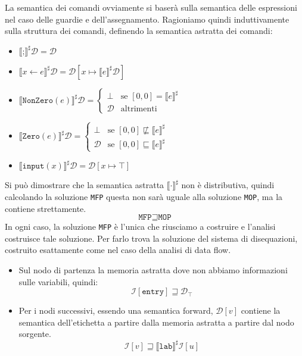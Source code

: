 La semantica dei comandi ovviamente si baserà sulla semantica delle espressioni 
nel caso delle guardie e dell'assegnamento. Ragioniamo quindi induttivamente sulla
struttura dei comandi, definendo la semantica astratta dei comandi:
\begin{itemize}
    \item $\llbracket \texttt{;} \rrbracket^\sharp \mathcal{D} = \mathcal{D}$
    \item $\llbracket x \gets e \rrbracket^\sharp \mathcal{D} =
    \mathcal{D}[x \mapsto \llbracket e \rrbracket^\sharp \mathcal{D}]$
    \item $\llbracket \texttt{NonZero}(e) \rrbracket^\sharp \mathcal{D} =
    \begin{cases}
        \bot & \text{se } [0, 0] = \llbracket e \rrbracket^\sharp \\
        \mathcal{D} & \text{altrimenti}
    \end{cases}
    $
    \item $\llbracket \texttt{Zero}(e) \rrbracket^\sharp \mathcal{D} =
    \begin{cases}
        \bot & \text{se } [0, 0] \not \sqsubseteq \llbracket e \rrbracket^\sharp \\
        \mathcal{D} & \text{se } [0, 0] \sqsubseteq \llbracket e \rrbracket^\sharp
    \end{cases}
    $
    \item $\llbracket \texttt{input}(x) \rrbracket^\sharp \mathcal{D} =
    \mathcal{D}[x \mapsto \top ]$
\end{itemize}
Si può dimostrare che la semantica astratta $\llbracket \cdot \rrbracket^\sharp$ non 
è distributiva, quindi calcolando la soluzione \texttt{MFP} questa non sarà uguale 
alla soluzione \texttt{MOP}, ma la contiene strettamente.
\[
  \texttt{MFP} \sqsupseteq \texttt{MOP}  
\]
In ogni caso, la soluzione \texttt{MFP} è l'unica che riusciamo a costruire e l'analisi 
costruisce tale soluzione. 
Per farlo trova la soluzione del sistema di disequazioni, costruito esattamente come nel 
caso della analisi di data flow.
\begin{itemize}
    \item Sul nodo di partenza la memoria astratta dove 
    non abbiamo informazioni sulle variabili, quindi:
    \[
        \mathcal{I}[\texttt{entry}] \sqsupseteq \mathcal{D}_\top 
    \]
    \item Per i nodi successivi, essendo una semantica forward, $\mathcal{D}[v]$ contiene 
    la semantica dell'etichetta a partire dalla memoria astratta a 
    partire dal nodo sorgente.
    \[
        \mathcal{I}[v] \sqsupseteq \llbracket \texttt{lab} \rrbracket^\sharp \mathcal{I}[u]
    \]
\end{itemize}
